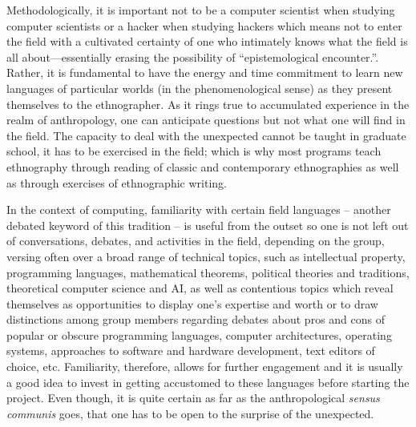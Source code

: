 \documentclass[10pt,letter,oneside]{scrartcl}
\begin{document}
Methodologically, it is important not to be a computer scientist when
studying computer scientists or a hacker when studying hackers which
means not to enter the field with a cultivated certainty of one who
intimately knows what the field is all about---essentially erasing the
possibility of ``epistemological encounter.''.  Rather, it is
fundamental to have the energy and time commitment to learn new
languages of particular worlds (in the phenomenological sense) as they
present themselves to the ethnographer.  As it rings true to
accumulated experience in the realm of anthropology, one can
anticipate questions but not what one will find in the field. The
capacity to deal with the unexpected cannot be taught in graduate
school, it has to be exercised in the field; which is why most programs
teach ethnography through reading of classic and contemporary
ethnographies as well as through exercises of ethnographic writing.

In the context of computing, familiarity with certain field languages
-- another debated keyword of this tradition -- is useful from the
outset so one is not left out of conversations, debates, and
activities in the field, depending on the group, versing often over a
broad range of technical topics, such as intellectual property,
programming languages, mathematical theorems, political theories and
traditions, theoretical computer science and AI, as well as
contentious topics which reveal themselves as opportunities to display
one's expertise and worth or to draw distinctions among group members
regarding debates about pros and cons of popular or obscure
programming languages, computer architectures, operating systems,
approaches to software and hardware development, text editors of
choice, etc. Familiarity, therefore, allows for further engagement and
it is usually a good idea to invest in getting accustomed to these
languages before starting the project. Even though, it is quite
certain as far as the anthropological \emph{sensus communis} goes,
that one has to be open to the surprise of the unexpected.


\end{document}
